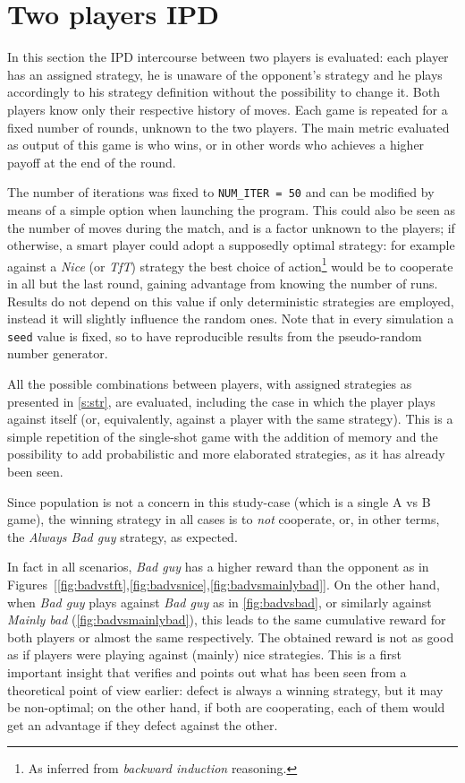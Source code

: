 \documentclass[journal,a4paper,10pt,twoside]{IEEEtran} %
\begin{document}
\section{Two players IPD} \label{s:IPD2P}
In this section the IPD intercourse between two players is evaluated: each player has an assigned strategy, he is unaware of the opponent's strategy and he plays accordingly to his strategy definition without the possibility to change it. Both players know only their respective history of moves. Each game is repeated for a fixed number of rounds, unknown to the two players. The main metric evaluated as output of this game is who wins, or in other words who achieves a higher payoff at the end of the round.

The number of iterations was fixed to \texttt{NUM\_ITER = 50} and can be modified by means of a simple option when launching the program.
This could also be seen as the number of moves during the match, and is a factor unknown to the players; if otherwise, a smart player could adopt a supposedly optimal strategy: for example against a \textit{Nice} (or \textit{TfT}) strategy the best choice of action\footnote{As inferred from \textit{backward induction} reasoning.} would be to cooperate in all but the last round, gaining advantage from knowing the number of runs.
Results do not depend on this value if only deterministic strategies are employed, instead it will slightly influence the random ones.
Note that in every simulation a \texttt{seed} value is fixed, so to have reproducible results from the pseudo-random number generator.

All the possible combinations between players, with assigned strategies as presented in \autoref{s:str}, are evaluated, including the case in which the player plays against itself (or, equivalently, against a player with the same strategy).
This is a simple repetition of the single-shot game with the addition of memory and the possibility to add probabilistic and more elaborated strategies, as it has already been seen.

Since population is not a concern in this study-case (which is a single A vs B game), the winning strategy in all cases is to \textit{not} cooperate, or, in other terms, the \textit{Always Bad guy} strategy, as expected.

In fact in all scenarios, \textit{Bad guy} has a higher reward than the opponent as in Figures~[\ref{fig:badvstft},\ref{fig:badvsnice},\ref{fig:badvsmainlybad}]. 
On the other hand, when \textit{Bad guy} plays against \textit{Bad guy} as in \autoref{fig:badvsbad}, or similarly against \textit{Mainly bad} (\autoref{fig:badvsmainlybad}), this leads to the same cumulative reward for both players or almost the same respectively. The obtained reward is not as good as if players were playing against (mainly) nice strategies. This is a first important insight that verifies and points out what has been seen from a theoretical point of view earlier: defect is always a winning strategy, but it may be non-optimal; on the other hand, if both are cooperating, each of them would get an advantage if they defect against the other.
\end{document}
